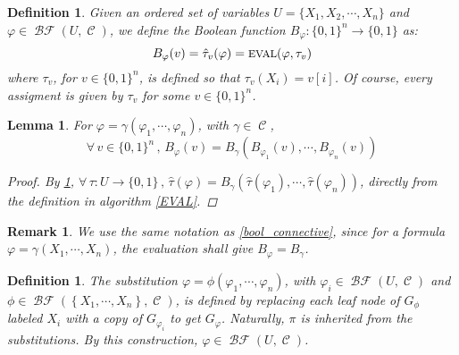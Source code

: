 \documentclass[12pt]{article}
\newcommand{\Forall}[1]{\forall\,{#1}\,,\,}
\newcommand{\seq}[2][0]{\left\{{#1},\cdots,{#2}\right\}}
\newcommand{\scrf}[1]{{\scriptstyle\textup{\footnotesize #1}}}
\DeclareMathOperator{\C}{\mathcal{C}}
\DeclareMathOperator{\BF}{\mathcal{BF}}
\newcommand*{\B}{\{0,1\}}
\newtheorem{definition}[theorem]{Definition}
\newtheorem{lemma}[theorem]{Lemma}
\newtheorem{remark}[theorem]{Remark}
\begin{document}
\begin{definition}
  \label{bool_fn_formula}
  Given an ordered set of variables $U=\{X_1,X_2,\cdots,X_n\}$ and $\varphi\in\BF(U,\C)$, we define the Boolean function $B_\varphi:\B^n\to\B$ as: $$B_\varphi(v)=\hat{\tau}_v(\varphi)=\scrf{EVAL}(\varphi,\tau_v)$$ where $\tau_v$, for $v\in\B^n$, is defined so that $\tau_v(X_i)=v[i]$. Of course, every assigment is given by $\tau_v$ for some $v\in\B^n$.
\end{definition}

\begin{lemma}
  \label{composing_booleans}
  For $\varphi=\gamma(\varphi_1,\cdots,\varphi_n)$, with $\gamma\in\C$,
  $$\Forall{v\in\B^n}B_\varphi(v)=B_\gamma(B_{\varphi_1}(v),\cdots,B_{\varphi_n}(v))$$
  \begin{proof}
    By \ref{bool_fn_formula}, $\Forall{\tau:U\to\B}\hat{\tau}(\varphi)=B_\gamma(\hat{\tau}(\varphi_1),\cdots,\hat{\tau}(\varphi_n))$, directly from the definition in algorithm \ref{EVAL}.
  \end{proof}
\end{lemma}

\begin{remark}
  We use the same notation as \ref{bool_connective}, since for a formula $\varphi=\gamma(X_1,\cdots,X_n)$, the evaluation shall give $B_\varphi=B_\gamma$.
\end{remark}

\begin{definition}
  \label{def_substitution}
  The substitution $\varphi=\phi(\varphi_1,\cdots,\varphi_n)$, with $\varphi_i\in\BF(U,\C)$ and $\phi\in\BF(\seq[X_1]{X_n},\C)$, is defined by replacing each leaf node of $G_\phi$ labeled $X_i$ with a copy of $G_{\varphi_i}$ to get $G_\varphi$. Naturally, $\pi$ is inherited from the substitutions. By this construction, $\varphi\in\BF(U,\C)$. 
\end{definition}
\end{document}
